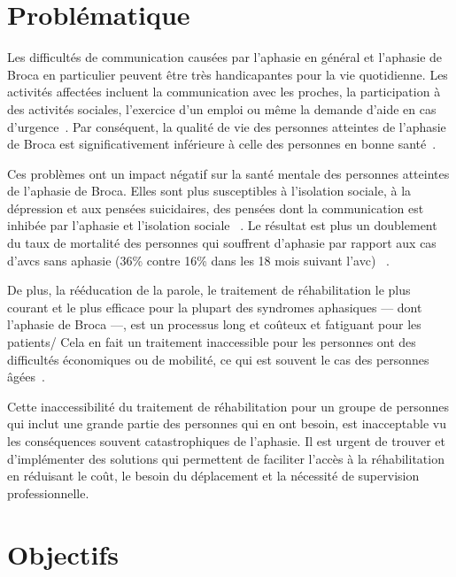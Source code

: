 \section*{Problématique}

Les difficultés de communication causées par l'aphasie en général 
et l'aphasie de Broca en particulier peuvent être très handicapantes pour la vie quotidienne.
Les activités affectées incluent la communication avec les proches, la participation à des activités sociales,
l'exercice d'un emploi ou même la demande d'aide en cas d'urgence~\cite{Hallowell_2017}.
Par conséquent, la qualité de vie des personnes atteintes de l'aphasie de Broca 
est significativement inférieure à celle des personnes en bonne santé~\cite{Pallavi_Perumal_Krupa_2018,Ross_Wertz_2010}.

Ces problèmes ont un impact négatif sur la santé mentale des personnes atteintes de l'aphasie de Broca.
Elles sont plus susceptibles à l'isolation sociale, à la dépression et aux pensées suicidaires,
des pensées dont la communication est inhibée par l'aphasie et l'isolation sociale%
~\cite{Costanza_et_al._2021,Morrison_2016}.
Le résultat est plus un doublement du taux de mortalité des personnes qui souffrent d'aphasie
par rapport aux cas d'\glspl{avc} sans aphasie (36\% contre 16\% dans les 18 mois suivant l'\gls{avc})%
~\cite{Laska_Hellblom_Murray_Kahan_Von_Arbin_2001}.

De plus, la rééducation de la parole, le traitement de réhabilitation le plus courant et le plus efficace 
pour la plupart des syndromes aphasiques --- dont l'aphasie de Broca ---,
est un processus long et coûteux et fatiguant pour les patients/
Cela en fait un traitement inaccessible pour les personnes ont des difficultés économiques ou de mobilité,
ce qui est souvent le cas des personnes âgées~\cite{Jacobs_Ellis_2021,Liu_Huang_Xu_Wu_Tao_Chen_2021}.

Cette inaccessibilité du traitement de réhabilitation pour un groupe de personnes 
qui inclut une grande partie des personnes qui en ont besoin, 
est inacceptable vu les conséquences souvent catastrophiques de l'aphasie.
Il est urgent de trouver et d'implémenter des solutions qui permettent de faciliter l'accès à la réhabilitation
en réduisant le coût, le besoin du déplacement et la nécessité de supervision professionnelle.

\section*{Objectifs}

